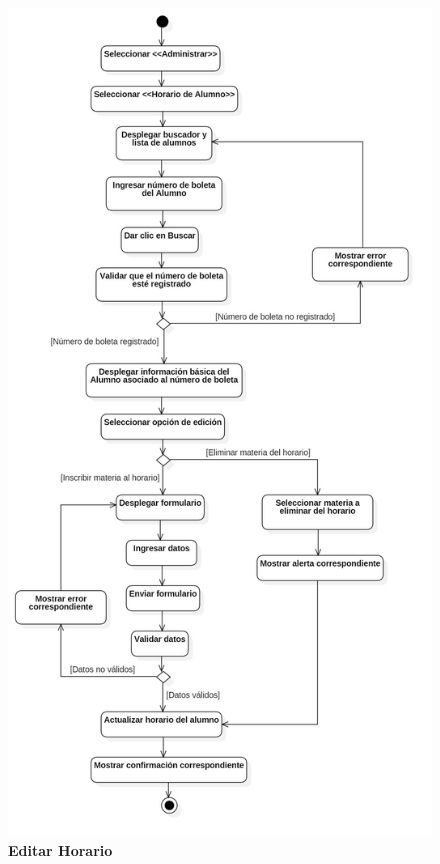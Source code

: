\begin{figure}[H]
  \centering
    \includegraphics[scale=.35,angle=0]{project/Actividades/A_editar_horario.jpg}
  \caption{\textbf{Editar Horario}}
\end{figure}
